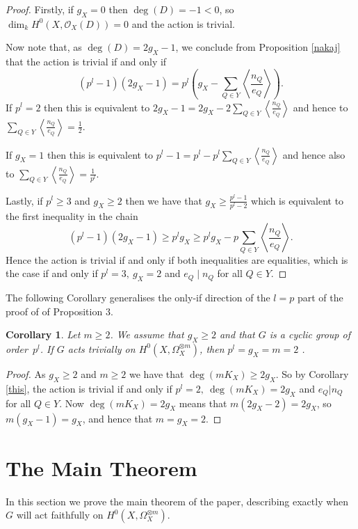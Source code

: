 \documentclass[11pt]{article} %
\newtheorem{cor}{Corollary}
\theoremstyle{remark}\newtheorem*{rem}{Remark}
\begin{document}
  \begin{proof}
    Firstly, if $g_X=0$ then $\deg(D)=-1<0$, so $\dim_kH^0(X,\mathscr{O}_X(D))=0$ and the action is trivial.

    Now note that, as $\deg(D)=2g_X-1$, we conclude from Proposition \ref{nakaj} that the action is trivial if and only if 
      \begin{equation*}
	(p^l-1)(2g_X-1)=p^l\left(g_X-\sum_{Q\in Y}\left\langle\frac{n_Q}{e_Q}\right\rangle\right).
      \end{equation*}
    If $p^l=2$ then this is equivalent to $2g_X-1=2g_X-2\sum_{Q\in Y}\left\langle\frac{n_Q}{e_Q}\right\rangle$ and hence to $\sum_{Q\in Y}\left\langle\frac{n_Q}{e_Q}\right\rangle=\frac{1}{2}$.

    If $g_X=1$ then this is equivalent to $p^l-1=p^l-p^l\sum_{Q\in Y}\left\langle\frac{n_Q}{e_Q}\right\rangle$ and hence also to $\sum_{Q\in Y}\left\langle\frac{n_Q}{e_Q}\right\rangle=\frac{1}{p^l}$.

    Lastly, if $p^l\geq 3$ and $g_X\geq 2$ then we have that $g_X\geq \frac{p^l-1}{p^l-2}$ which is equivalent to the first inequality in the chain
      \begin{equation*}
	(p^l-1)(2g_X-1)\geq p^lg_X\geq p^lg_X-p\sum_{Q\in Y}\left\langle\frac{n_Q}{e_Q}\right\rangle.
      \end{equation*}
    Hence the action is trivial if and only if both inequalities are equalities, which is the case if and only if $p^l=3,\ g_X=2$ and $e_Q\mid n_Q$ for all $Q\in Y$.
  \end{proof}

The following Corollary generalises the only-if direction of the $l=p$ part of the proof of of Proposition $3$.\\

  \begin{cor}
    Let $m\geq 2$. 
    We assume that $g_X\geq 2$ and that $G$ is a cyclic group of order~$p^l$. 
    If $G$ acts trivially on $H^0(X,\Omega_X^{\otimes m})$, then $p^l=g_X=m=2$   .
  \end{cor}
  \begin{proof}
    As $g_X\geq 2$ and $m\geq 2$ we have that $\deg(mK_X)\geq 2g_X$. 
    So by Corollary \ref{this}, the action is trivial if and only if $p^l=2,\ \deg(mK_X)=2g_X$ and $e_Q | n_Q$ for all $Q\in Y$. 
    Now $\deg(mK_X)=2g_X$ means that $m(2g_X-2)=2g_X$, so $m(g_X-1)=g_X$, and hence that $m=g_X=2$. 
  \end{proof}

  \section{The Main Theorem}
  In this section we prove the main theorem of the paper, describing exactly when $G$ will act faithfully on $H^0(X,\Omega_X^{\otimes m})$.
\end{document}
